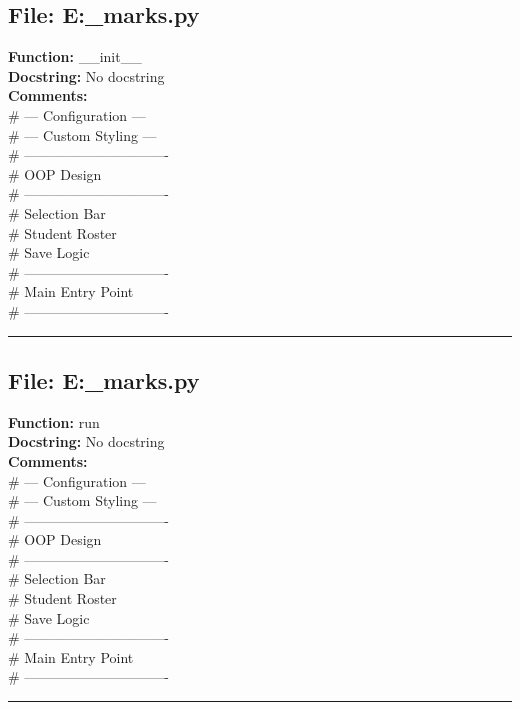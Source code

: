 {\subsection*{File: E:\project\capstone\frontend\faculty\assignment_marks.py}
\textbf{Function:} __init__\\
\textbf{Docstring:} No docstring\\
\textbf{Comments:}\\
# --- Configuration ---\\
# --- Custom Styling ---\\
# -------------------------------\\
# OOP Design\\
# -------------------------------\\
# Selection Bar\\
# Student Roster\\
# Save Logic\\
# -------------------------------\\
# Main Entry Point\\
# -------------------------------\\

\hrule

\subsection*{File: E:\project\capstone\frontend\faculty\assignment_marks.py}
\textbf{Function:} run\\
\textbf{Docstring:} No docstring\\
\textbf{Comments:}\\
# --- Configuration ---\\
# --- Custom Styling ---\\
# -------------------------------\\
# OOP Design\\
# -------------------------------\\
# Selection Bar\\
# Student Roster\\
# Save Logic\\
# -------------------------------\\
# Main Entry Point\\
# -------------------------------\\

\hrule

}
